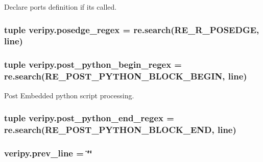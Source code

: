 Declare ports definition if its called. 

\hypertarget{namespaceveripy_a539ac3ffa8c747bee3236b8735881ca3}{
\subsubsection[{posedge\-\_\-regex}]{\setlength{\rightskip}{0pt plus 5cm}tuple veripy.\-posedge\-\_\-regex = re.\-search(R\-E\-\_\-\-R\-\_\-\-P\-O\-S\-E\-D\-G\-E, {\bf line})}}\label{namespaceveripy_a539ac3ffa8c747bee3236b8735881ca3}
\hypertarget{namespaceveripy_a182e7c6ae2aef981c047222e8d1c879a}{
\subsubsection[{post\-\_\-python\-\_\-begin\-\_\-regex}]{\setlength{\rightskip}{0pt plus 5cm}tuple veripy.\-post\-\_\-python\-\_\-begin\-\_\-regex = re.\-search(R\-E\-\_\-\-P\-O\-S\-T\-\_\-\-P\-Y\-T\-H\-O\-N\-\_\-\-B\-L\-O\-C\-K\-\_\-\-B\-E\-G\-I\-N, {\bf line})}}\label{namespaceveripy_a182e7c6ae2aef981c047222e8d1c879a}


Post Embedded python script processing. 

\hypertarget{namespaceveripy_a62ec90ed0de88469b45538484946a5b7}{
\subsubsection[{post\-\_\-python\-\_\-end\-\_\-regex}]{\setlength{\rightskip}{0pt plus 5cm}tuple veripy.\-post\-\_\-python\-\_\-end\-\_\-regex = re.\-search(R\-E\-\_\-\-P\-O\-S\-T\-\_\-\-P\-Y\-T\-H\-O\-N\-\_\-\-B\-L\-O\-C\-K\-\_\-\-E\-N\-D, {\bf line})}}\label{namespaceveripy_a62ec90ed0de88469b45538484946a5b7}
\hypertarget{namespaceveripy_a716a6e8cf97f3b8c4bc93680674397cd}{
\subsubsection[{prev\-\_\-line}]{\setlength{\rightskip}{0pt plus 5cm}veripy.\-prev\-\_\-line = \char`\"{}\char`\"{}}}\label{namespaceveripy_a716a6e8cf97f3b8c4bc93680674397cd}


